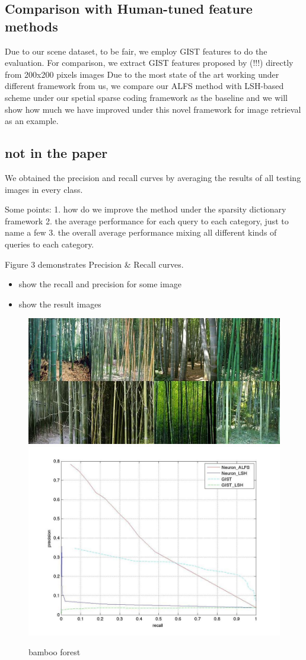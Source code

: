 \documentclass[letterpaper]{article}
\begin{document}
\subsection{Comparison with Human-tuned feature methods}
Due to our scene dataset, to be fair, we employ GIST features to do the evaluation. For comparison, we extract GIST features proposed by (!!!) directly from 200x200 pixels images 
Due to the most state of the art working under different framework from us,  we compare our ALFS method with LSH-based scheme under our spetial sparse coding framework as the baseline and we will show how much we have improved under this novel framework for image retrieval as an example. 


   
\subsection{not in the paper}
We obtained the precision and recall curves by averaging the results of all testing images in every class.

Some points:
1. how do we improve the method under the sparsity dictionary framework
2. the average performance for each query to each category, just to name a few
3. the overall average performance mixing all different kinds of queries to each category.

Figure 3 demonstrates Precision \& Recall curves. 


\begin{itemize}
\item show the recall and precision for some image
\item show the result images
\end{itemize}

\begin{figure}[!ht]
		\centering
		\includegraphics[width=.4\textwidth]{figures_dir/bamboo_forest.jpg}
		\includegraphics[width=.4\textwidth]{figures_dir/bamboo_10queries.jpg}
		\caption{bamboo forest}
		\label{TEMP!!! bamboo_forest 10 queries images}
\end{figure}
\end{document}
